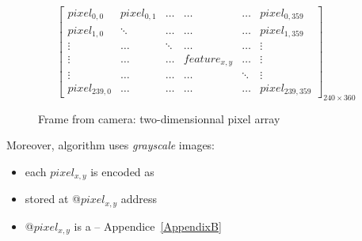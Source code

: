 \begin{figure}[!htbp]
\[
\begin{bmatrix}

pixel_{0,0} & pixel_{0,1} & \ldots & \ldots & \ldots & pixel_{0,359}\\

pixel_{1,0} & \ddots & \ldots & \ldots & \ldots & pixel_{1,359}\\

\vdots & \ldots & \ddots & \ldots & \ldots & \vdots\\

\vdots & \ldots & \ldots & feature_{x,y} & \ldots & \vdots\\

\vdots & \ldots & \ldots & \ldots & \ddots & \vdots\\

pixel_{239,0} & \ldots & \ldots  & \ldots & \ldots & pixel_{239,359}

\end{bmatrix}_{240\times 360}
\]
\caption{Frame from camera: two-dimensionnal pixel array}
\label{frameFig}
\end{figure}
\FloatBarrier

Moreover,  algorithm uses \emph{grayscale} images:

\begin{itemize}
	\item each $pixel_{x,y}$ is encoded as 
	\item stored at @$pixel_{x,y}$ address
	\item @$pixel_{x,y}$ is a  -- Appendice~\ref{AppendixB}
\end{itemize}\\~\\


